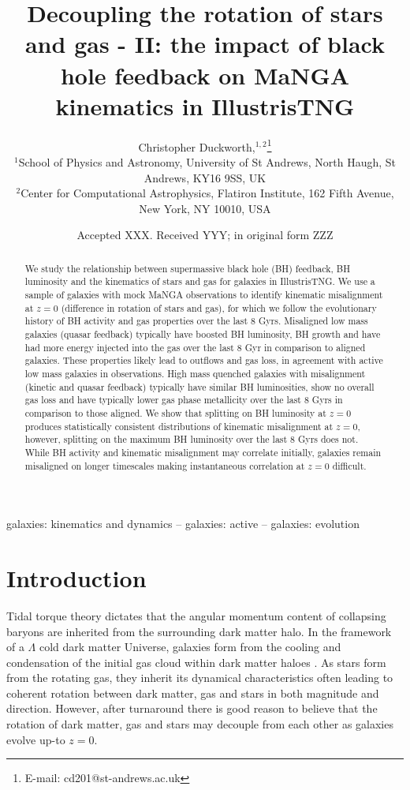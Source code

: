 \documentclass[fleqn,usenatbib]{mnras}
\title[Decoupling the rotation of stars and gas - II]{Decoupling the rotation of stars and gas - II: the impact of black hole feedback on MaNGA kinematics in IllustrisTNG}
\author[C. Duckworth et al.]
{Christopher Duckworth,$^{1,2}$\thanks{E-mail: cd201@st-andrews.ac.uk}
\\
$^{1}$School of Physics and Astronomy, University of St Andrews, North Haugh, St Andrews, KY16 9SS, UK\\
$^{2}$Center for Computational Astrophysics, Flatiron Institute, 162 Fifth Avenue, New York, NY 10010, USA\\
}
\date{Accepted XXX. Received YYY; in original form ZZZ}
\begin{document}
\label{firstpage}
\pagerange{\pageref{firstpage}--\pageref{lastpage}}
\maketitle

\begin{abstract}
We study the relationship between supermassive black hole (BH) feedback, BH luminosity and the kinematics of stars and gas for galaxies in IllustrisTNG. We use a sample of galaxies with mock MaNGA observations to identify kinematic misalignment at $z=0$ (difference in rotation of stars and gas), for which we follow the evolutionary history of BH activity and gas properties over the last 8 Gyrs. Misaligned low mass galaxies (quasar feedback) typically have boosted BH luminosity, BH growth and have had more energy injected into the gas over the last 8 Gyr in comparison to aligned galaxies. These properties likely lead to outflows and gas loss, in agreement with active low mass galaxies in observations. High mass quenched galaxies with misalignment (kinetic and quasar feedback) typically have similar BH luminosities, show no overall gas loss and have typically lower gas phase metallicity over the last 8 Gyrs in comparison to those aligned. We show that splitting on BH luminosity at $z=0$ produces statistically consistent distributions of kinematic misalignment at $z=0$, however, splitting on the maximum BH luminosity over the last 8 Gyrs does not. While BH activity and kinematic misalignment may correlate initially, galaxies remain misaligned on longer timescales making instantaneous correlation at $z=0$ difficult.
\end{abstract}

\begin{keywords}
galaxies: kinematics and dynamics -- galaxies: active -- galaxies: evolution
\end{keywords}



\section{Introduction}
Tidal torque theory \citep[][]{hoyle1951, peebles1969, Doroshkevich1970} dictates that the angular momentum content of collapsing baryons are inherited from the surrounding dark matter halo. In the framework of a $\Lambda$ cold dark matter Universe, galaxies form from the cooling and condensation of the initial gas cloud within dark matter haloes \citep{fall1980, mo1998}. As stars form from the rotating gas, they inherit its dynamical characteristics often leading to coherent rotation between dark matter, gas and stars in both magnitude and direction. However, after turnaround there is good reason to believe that the rotation of dark matter, gas and stars may decouple from each other as galaxies evolve up-to $z=0$. 
\end{document}
